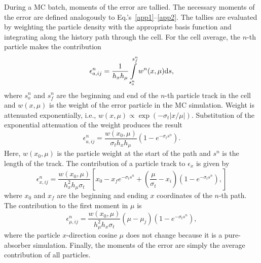 During a MC batch, moments of the error are tallied.  The necessary moments of the error are
defined analogously to Eq.'s~\eqref{app1}--\eqref{app2}.
The tallies are evaluated by weighting the particle density with the appropriate
basis function and integrating along the history path through the cell.  For the cell average, the $n$-th
particle makes the contribution
\begin{equation}
    \epsilon^n_{a,ij} = \frac{1}{h_xh_\mu} \int\limits_{s^n_o}^{s^n_f}  w^n(x,\mu) \mathrm{d} s,
\end{equation}
where $s_o^n$ and $s_f^n$ are the beginning and end of the $n$-th particle track in the cell and $w(x,\mu)$ is
the weight of the error particle in the MC simulation.  Weight is attenuated exponentially, i.e., $w(x,\mu)\propto
\exp(-\sigma_t|x/\mu|)$.
Substitution of the exponential attenuation of the weight produces the result
\begin{equation}
    \epsilon^n_{a,ij} = \frac{w(x_0,\mu)}{\sigma_t h_x h_\mu} \left(1 -
    e^{-\sigma_ts^n}\right).
\end{equation}
Here, $w(x_0,\mu)$ is the particle weight at the start of the path and $s^n$ is the
length of the track. The contribution of a
particle track to $\epsilon_x$ is given by
\begin{equation}
    \epsilon^n_{x,ij} = \frac{w(x_0,\mu)}{h_x^2h_\mu \sigma_t} \left[x_0 - x_f e^{-\sigma_t s^n}
        + \left(\frac{\mu}{\sigma_t} - x_i \right)\left(1-e^{-\sigma_t s^n}\right),
    \right]
\end{equation}
where $x_0$ and $x_f$ are the beginning and ending $x$ coordinates of the $n$-th
path.  The contribution to the first moment in $\mu$ is 
\begin{equation}
    \epsilon^n_{\mu,ij} = \frac{w(x_0,\mu)}{h_{\mu}^2h_x\sigma_t}\left(\mu -
    \mu_j\right) \left(1 - e^{-\sigma_ts^n}\right),
\end{equation}
where the particle $x$-direction cosine $\mu$ does not change because it is a pure-absorber simulation.
Finally, the moments of the error are simply the average contribution of all particles.

